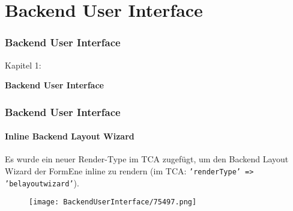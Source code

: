 %

\section{Backend User Interface}
\begin{frame}[fragile]
	\frametitle{Backend User Interface}

	\begin{center}\huge{Kapitel 1:}\end{center}
	\begin{center}\huge{\color{typo3darkgrey}\textbf{Backend User Interface}}\end{center}

\end{frame}

\begin{frame}[fragile]
	\frametitle{Backend User Interface}
	\framesubtitle{Inline Backend Layout Wizard}

	Es wurde ein neuer Render-Type im TCA zugefügt, um den Backend Layout Wizard der FormEne inline zu rendern
	(im TCA: \texttt{'renderType' => 'belayoutwizard'}).

	\begin{figure}
		\texttt{[image: BackendUserInterface/75497.png]}
	\end{figure}

\end{frame}


